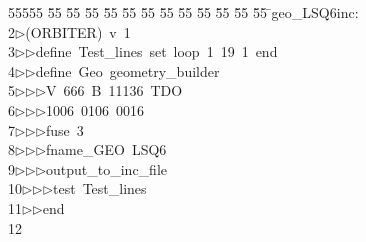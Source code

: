 %
%
\begin{tabbing}
55555 \= 55 \= 55 \= 55 \= 55 \= 55 \= 55 \= 55 \= 55 \= 55 \= 55 \= 55 \= 55 \= \>geo\_LSQ6inc:\\[0pt]
2\>$\triangleright$\>(ORBITER)\ v\ 1\ \\[0pt]
3\>$\triangleright$\>$\triangleright$\>define\ Test\_lines\ set\ loop\ 1\ 19\ 1\ end\ \\[0pt]
4\>$\triangleright$\>$\triangleright$\>define\ Geo\ geometry\_builder\ \\[0pt]
5\>$\triangleright$\>$\triangleright$\>$\triangleright$\>V\ 666\ B\ 11136\ TDO\ \\[0pt]
6\>$\triangleright$\>$\triangleright$\>$\triangleright$\>1006\ 0106\ 0016\ \\[0pt]
7\>$\triangleright$\>$\triangleright$\>$\triangleright$\>fuse\ 3\ \\[0pt]
8\>$\triangleright$\>$\triangleright$\>$\triangleright$\>fname\_GEO\ LSQ6\ \\[0pt]
9\>$\triangleright$\>$\triangleright$\>$\triangleright$\>output\_to\_inc\_file\ \\[0pt]
10\>$\triangleright$\>$\triangleright$\>$\triangleright$\>test\ Test\_lines\ \\[0pt]
11\>$\triangleright$\>$\triangleright$\>end\\[0pt]
12\>\end{tabbing}
